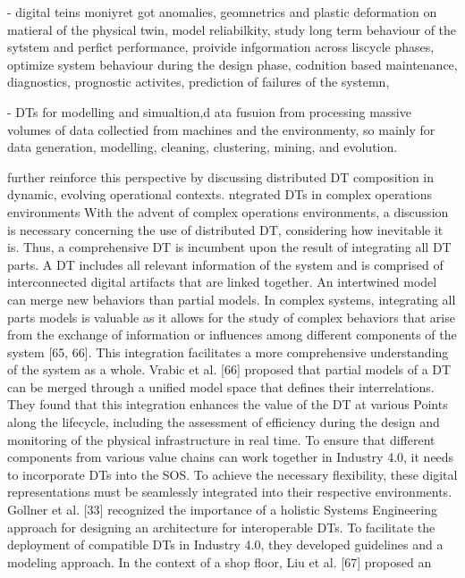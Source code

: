 \cite{negri2017review} - digital teins moniyret got anomalies, geomnetrics and plastic deformation on matieral of the physical twin, model reliabilkity, study long term behaviour of the sytstem and perfict performance, proivide infgormation across liscycle phases, optimize system behaviour during the design phase, codnition based maintenance, diagnostics, prognostic activites, prediction of failures of the systemn, 

\cite{tao2018digital} - DTs for modelling and simualtion,d ata fusuion from processing massive volumes of data collectied from machines and the environmenty, so mainly for data generation, modelling, cleaning, clustering, mining, and evolution. 


\textcite{ghanbarifard2023digital} further reinforce this perspective by discussing distributed DT composition in dynamic, evolving operational contexts. ntegrated DTs in complex operations environments
With the advent of complex operations environments, a
discussion is necessary concerning the use of distributed DT,
considering how inevitable it is. Thus, a comprehensive DT is
incumbent upon the result of integrating all DT parts.
A DT includes all relevant information of the system and is
comprised of interconnected digital artifacts that are linked
together. An intertwined model can merge new behaviors than
partial models. In complex systems, integrating all parts models
is valuable as it allows for the study of complex behaviors that
arise from the exchange of information or influences among
different components of the system [65, 66]. This integration
facilitates a more comprehensive understanding of the system as
a whole.
Vrabic et al. [66] proposed that partial models of a DT can
be merged through a unified model space that defines their
interrelations. They found that this integration enhances the
value of the DT at various Points along the lifecycle, including
the assessment of efficiency during the design and monitoring
of the physical infrastructure in real time.
To ensure that different components from various value
chains can work together in Industry 4.0, it needs to incorporate
DTs into the SOS. To achieve the necessary flexibility, these
digital representations must be seamlessly integrated into their
respective environments. Gollner et al. [33] recognized the
importance of a holistic Systems Engineering approach for
designing an architecture for interoperable DTs. To facilitate the
deployment of compatible DTs in Industry 4.0, they developed
guidelines and a modeling approach.
In the context of a shop floor, Liu et al. [67] proposed an
